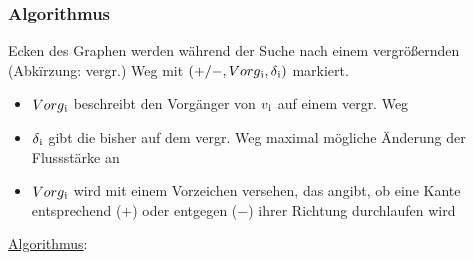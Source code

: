 \documentclass[11pt]{article}
\begin{document}
    \subsubsection{Algorithmus}
    Ecken des Graphen werden w\"ahrend der Suche nach einem vergr\"o\ss{}ernden (Abk\"irzung: vergr.) Weg mit $(+/-, Vorg\textsubscript{i}, \delta\textsubscript{i})$ markiert.
    \begin{itemize}
        \item $Vorg\textsubscript{i}$ beschreibt den Vorg\"anger von $v\textsubscript{i}$ auf einem vergr. Weg
        \item $\delta\textsubscript{i}$ gibt die bisher auf dem vergr. Weg maximal m\"ogliche \"Anderung der Flussst\"arke an
        \item $Vorg\textsubscript{i}$ wird mit einem Vorzeichen versehen, das angibt, ob eine Kante entsprechend ($+$) oder entgegen ($-$) ihrer Richtung durchlaufen wird
    \end{itemize}
    \newpage
    \underline{Algorithmus}:
\end{document}
